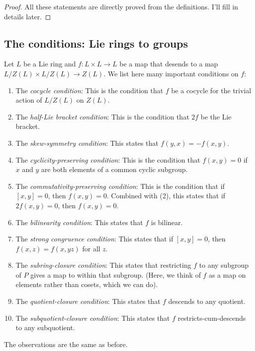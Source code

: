 \documentclass[10pt]{amsart}
\begin{document}
\begin{proof}
  All these statements are directly proved from the definitions. I'll
  fill in details later.
\end{proof}

\subsection{The conditions: Lie rings to groups}

Let $L$ be a Lie ring and $f:L \times L \to L$ be a map that desends
to a map $L/Z(L) \times L/Z(L) \to Z(L)$. We list here many important
conditions on $f$:

\begin{enumerate}
\item The {\em cocycle condition}: This is the condition that $f$ be a
  cocycle for the trivial action of $L/Z(L)$ on $Z(L)$.
\item The {\em half-Lie bracket condition}: This is the condition that
  $2f$ be the Lie bracket.
\item The {\em skew-symmetry condition}: This states that $f(y,x) =
  -f(x,y)$.
\item The {\em cyclicity-preserving condition}: This is the condition
  that $f(x,y) = 0$ if $x$ and $y$ are both elements of a common
  cyclic subgroup.
\item The {\em commutativity-preserving condition}: This is the
  condition that if $[x,y] = 0$, then $f(x,y) = 0$. Combined with (2),
  this states that if $2f(x,y) = 0$, then $f(x,y) = 0$.
\item The {\em bilinearity condition}: This states that $f$ is
  bilinear.
\item The {\em strong congruence condition}: This states that if
  $[x,y] = 0$, then $f(x,z) = f(x,yz)$ for all $z$.
\item The {\em subring-closure condition}: This states that
  restricting $f$ to any subgroup of $P$ gives a map to within that
  subgroup. (Here, we think of $f$ as a map on elements rather than
  cosets, which we can do).
\item The {\em quotient-closure condition}: This states that $f$
  descends to any quotient.
\item The {\em subquotient-closure condition}: This states that $f$
  restricts-cum-descends to any subquotient.
\end{enumerate}

The observations are the same as before.
\end{document}
